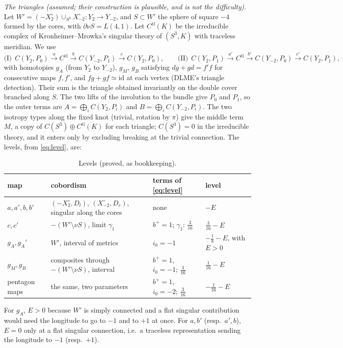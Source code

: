 \documentclass[10pt]{amsart}
\numberwithin{equation}{section}
\theoremstyle{compact}
\theoremstyle{definition}
\newcommand{\tl}{\mathrm{tl}}
\newcommand{\st}[1]{\par\noindent\textit{#1}\enspace}
\begin{document}
\st{The triangles (assumed; their construction is plausible, and is not
the difficulty).} Let $W'=(-X_2^\circ)\cup_{S^3}X_{-2}^\circ\colon Y_2\to
Y_{-2}$, and $S\subset W'$ the sphere of square $-4$ formed by the cores,
with $\partial\nu S=L(4,1)$. Let $C^\tl(K)$ be the irreducible complex of
Kronheimer--Mrowka's singular theory of $(S^3,K)$ with traceless meridian.
We use
\[
\text{(I)}\ \ C(Y_2,P_0)\xrightarrow{a}C^\tl\xrightarrow{b}C(Y_{-2},P_1)\xrightarrow{c}C(Y_2,P_0),\qquad
\text{(II)}\ \ C(Y_2,P_1)\xrightarrow{a'}C^\tl\xrightarrow{b'}C(Y_{-2},P_0)\xrightarrow{c'}C(Y_2,P_1),
\]
with homotopies $g_A$ (from $Y_2$ to $Y_{-2}$), $g_M$, $g_B$ satisfying
$dg+gd=f'f$ for consecutive maps $f,f'$, and $fg+gf\simeq\mathrm{id}$ at each
vertex (DLME's triangle detection). Their sum is the triangle obtained
invariantly on the double cover branched along $S$. The two lifts of the
involution to the bundle give $P_0$ and $P_1$, so the outer terms are
$A=\bigoplus_iC(Y_2,P_i)$ and $B=\bigoplus_iC(Y_{-2},P_i)$. The two
isotropy types along the fixed knot (trivial, rotation by $\pi$) give the
middle term $M$, a copy of $C(S^3)\oplus C^\tl(K)$ for each triangle;
$C(S^3)=0$ in the irreducible theory, and it enters only by excluding
breaking at the trivial connection. The levels, from \eqref{eq:level}, are:

\begin{table}[h]\small
\begin{tabular}{llll}
map & cobordism & terms of \eqref{eq:level} & level\\\hline
$a,a',b,b'$ & $(-X_2^\circ,D_l)$, $(X_{-2}^\circ,D_r)$, singular along the cores & none & $-E$\\
$c,c'$ & $-(W'\setminus\nu S)$, limit $\gamma_1$ & $b^+=1$; $\gamma_1$: $\frac3{16}$ & $\frac3{16}-E$\\
$g_A,g_A'$ & $W'$, interval of metrics & $i_0=-1$ & $-\frac18-E$, with $E>0$\\
$g_M,g_B$ & composites through $-(W'\setminus\nu S)$, interval & $b^+=1$, $i_0=-1$; $\frac3{16}$ & $\frac1{16}-E$\\
pentagon maps & the same, two parameters & $b^+=1$, $i_0=-2$; $\frac3{16}$ & $-\frac1{16}-E$
\end{tabular}
\caption{Levels (proved, as bookkeeping).}\label{tab:levels}
\end{table}
\vspace{-1em}
\noindent For $g_A$, $E>0$ because $W'$ is simply connected and a flat
singular contribution would need the longitude to go to $-1$ and to $+1$ at
once. For $a,b'$ (resp.\ $a',b$), $E=0$ only at a flat singular connection,
i.e.\ a traceless representation sending the longitude to $-1$ (resp.\
$+1$).
\end{document}
